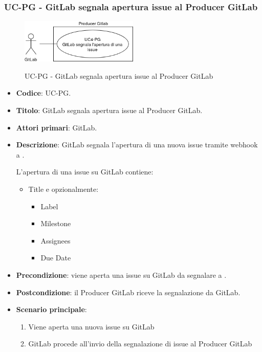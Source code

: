 \subsubsection{UC\theuccount-PG - GitLab segnala apertura issue al Producer GitLab}
	\begin{figure}[H]
		\centering
		\includegraphics[width=0.5\textwidth]{img/casi_d'uso/UC4.png}\\
		\caption{UC\theuccount-PG - GitLab segnala apertura issue al Producer GitLab}
	\end{figure}
	\begin{itemize}
		\item \textbf{Codice}: UC\theuccount-PG.
		\item \textbf{Titolo}: GitLab segnala apertura issue al Producer GitLab.
		\item \textbf{Attori primari}: GitLab.
		\item \textbf{Descrizione}: GitLab segnala l'apertura di una nuova issue tramite webhook a \progetto.
		
		L'apertura di una issue su GitLab contiene:
		\begin{itemize}
			\item Title e opzionalmente:
			\begin{itemize}
				\item Label
				\item Milestone
				\item Assignees
				\item Due Date
			\end{itemize}
		\end{itemize}
		\item \textbf{Precondizione}: viene aperta una issue su GitLab da 
		segnalare a \progetto.
		\item \textbf{Postcondizione}: il Producer GitLab riceve la segnalazione da GitLab.
		\item \textbf{Scenario principale}: 
		\begin{enumerate}
			\item Viene aperta una nuova issue su GitLab
			\item GitLab procede all'invio della segnalazione di issue al Producer GitLab
		\end{enumerate}
		
	\end{itemize}